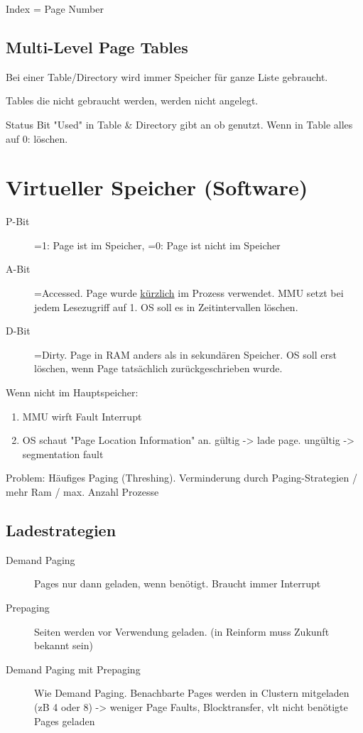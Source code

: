 \begin{multicols*}{4}
Index = Page Number

\subsection{Multi-Level Page Tables}
Bei einer Table/Directory wird immer Speicher für ganze Liste gebraucht.

Tables die nicht gebraucht werden, werden nicht angelegt.

Status Bit "Used" in Table \& Directory gibt an ob genutzt. Wenn in Table alles auf 0: löschen.

\section{Virtueller Speicher (Software)}
\begin{description}
    \item[P-Bit] =1: Page ist im Speicher, =0: Page ist nicht im Speicher
    \item[A-Bit] =Accessed. Page wurde \underline{kürzlich} im Prozess verwendet. MMU setzt bei jedem Lesezugriff auf 1. OS soll es in Zeitintervallen löschen.
    \item[D-Bit] =Dirty. Page in RAM anders als in sekundären Speicher. OS soll erst löschen, wenn Page tatsächlich zurückgeschrieben wurde.
\end{description}
\vspace{2pt}
Wenn nicht im Hauptspeicher:
\begin{enumerate}
    \item MMU wirft Fault Interrupt
    \item OS schaut "Page Location Information" an. gültig -> lade page. ungültig -> segmentation fault
\end{enumerate}

Problem: Häufiges Paging (Threshing). Verminderung durch Paging-Strategien / mehr Ram / max. Anzahl Prozesse

\subsection{Ladestrategien}
\begin{description}
    \item[Demand Paging] Pages nur dann geladen, wenn benötigt. Braucht immer Interrupt
    \item[Prepaging] Seiten werden vor Verwendung geladen. (in Reinform muss Zukunft bekannt sein)
    \item[Demand Paging mit Prepaging] Wie Demand Paging. Benachbarte Pages werden in Clustern mitgeladen (zB 4 oder 8)
    -> weniger Page Faults, Blocktransfer, vlt nicht benötigte Pages geladen
\end{description}


\end{multicols*}
